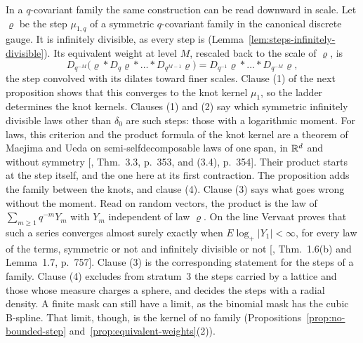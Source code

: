In a $q$-covariant family the same construction can be read downward in scale. Let $\varrho$ be the
step $\mu_{1,q}$ of a symmetric $q$-covariant family in the canonical discrete gauge. It is
infinitely divisible, as every step is (Lemma~\ref{lem:steps-infinitely-divisible}). Its
equivalent weight at level $M$, rescaled back to the scale of $\varrho$, is
\[
  D_{q^{-M}}\bigl(\varrho * D_q\varrho * \dots * D_{q^{M-1}}\varrho\bigr)
  = D_{q^{-1}}\varrho * \dots * D_{q^{-M}}\varrho ,
\]
the step convolved with its dilates toward finer scales. Clause (1) of the next proposition shows
that this converges to the knot kernel $\mu_1$, so the ladder determines the knot kernels. Clauses
(1) and (2) say which symmetric infinitely divisible laws other than $\delta_0$ are such steps:
those with a logarithmic moment. For laws, this criterion and the product formula of the knot kernel
are a theorem of Maejima and Ueda on semi-selfdecomposable laws of one span, in $\mathbb{R}^d$ and without
symmetry [, Thm.~3.3, p.~353, and (3.4), p.~354]. Their product starts at
the step itself, and the one here at its first contraction. The proposition adds the family
between the knots, and clause (4). Clause (3) says what goes wrong without the moment. Read on
random vectors, the product is the law of $\sum_{m \ge 1}q^{-m}Y_m$ with $Y_m$ independent of law
$\varrho$. On the line Vervaat proves that such a series converges almost surely exactly when
$E\log_+|Y_1| < \infty$, for every law of the terms, symmetric or not and infinitely divisible or
not [, Thm.~1.6(b) and Lemma~1.7, p.~757]. Clause (3) is the
corresponding statement for the steps of a family. Clause (4)
excludes from stratum~3 the steps carried by a lattice and those whose \Levy{} measure charges a
sphere, and decides the steps with a radial \Levy{} density. A finite mask can still have a limit,
as the binomial mask has the cubic B-spline. That limit, though, is the kernel of no family (Propositions~\ref{prop:no-bounded-step} and~\ref{prop:equivalent-weights}(2)).

